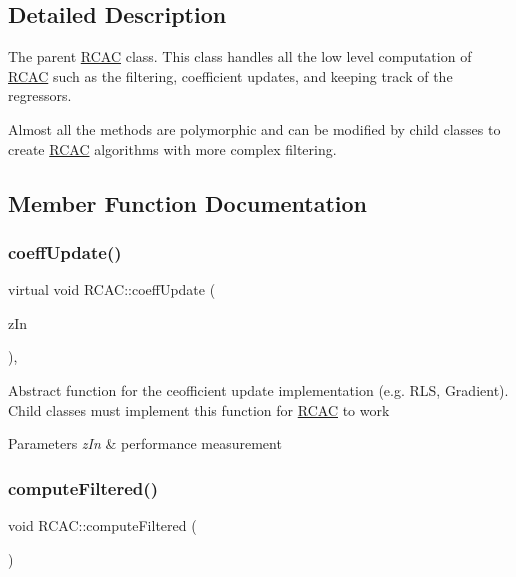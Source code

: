 \subsection{Detailed Description}
The parent \hyperlink{class_r_c_a_c}{R\+C\+AC} class. This class handles all the low level computation of \hyperlink{class_r_c_a_c}{R\+C\+AC} such as the filtering, coefficient updates, and keeping track of the regressors.

Almost all the methods are polymorphic and can be modified by child classes to create \hyperlink{class_r_c_a_c}{R\+C\+AC} algorithms with more complex filtering. 

\subsection{Member Function Documentation}
\mbox{\label{class_r_c_a_c_a5ac60fc4b359cf5555427bd1652d6ca1}} 
\subsubsection{\texorpdfstring{coeff\+Update()}{coeffUpdate()}}
{\footnotesize\ttfamily virtual void R\+C\+A\+C\+::coeff\+Update (\begin{DoxyParamCaption}\item[{Eigen\+::\+Vector\+Xd \&}]{z\+In }\end{DoxyParamCaption})\hspace{0.3cm}{\ttfamily [protected]}, {}}

Abstract function for the ceofficient update implementation (e.\+g. R\+LS, Gradient). Child classes must implement this function for \hyperlink{class_r_c_a_c}{R\+C\+AC} to work


\begin{DoxyParams}{Parameters}
{\em z\+In} & performance measurement \\
\hline
\end{DoxyParams}
\mbox{\label{class_r_c_a_c_a5e6bc7050ced3b1be7d9060d089dccfb}} 
\subsubsection{\texorpdfstring{compute\+Filtered()}{computeFiltered()}}
{\footnotesize\ttfamily void R\+C\+A\+C\+::compute\+Filtered (\begin{DoxyParamCaption}{ }\end{DoxyParamCaption})\hspace{0.3cm}{\ttfamily [protected]}}

